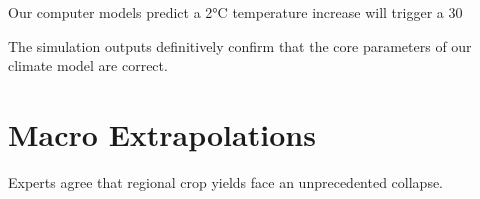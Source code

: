 \documentclass{article}
\begin{document}
Our computer models predict a 2°C temperature increase will trigger a 30%

The simulation outputs definitively confirm that the core parameters of our climate model are correct.

\section{Macro Extrapolations}
Experts agree that regional crop yields face an unprecedented collapse.
\end{document}

